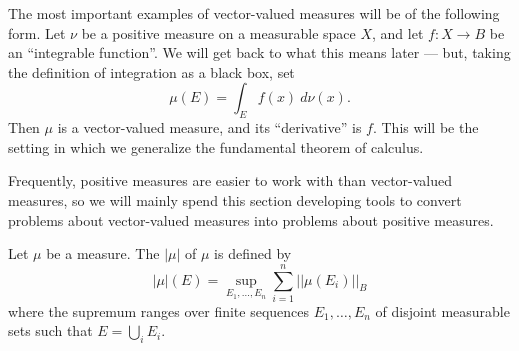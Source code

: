 \begin{example}
The most important examples of vector-valued measures will be of the following form.
Let $\nu$ be a positive measure on a measurable space $X$, and let $f: X \to B$ be an ``integrable function''.
We will get back to what this means later --- but, taking the definition of integration as a black box, set
\[\mu(E) = \int_{E} f(x) ~d\nu(x).\]
Then $\mu$ is a vector-valued measure, and its ``derivative'' is $f$.
This will be the setting in which we generalize the fundamental theorem of calculus.
\end{example}

\begin{subsec}
Frequently, positive measures are easier to work with than vector-valued measures, so we will mainly spend this section developing tools to convert problems about vector-valued measures into problems about positive measures.
\end{subsec}

\begin{definition}
Let $\mu$ be a measure. The  $|\mu|$ of $\mu$ is defined by
\[|\mu|(E) = \sup_{E_{1}, \dots, E_{n}} \sum_{i=1}^{n} ||\mu(E_{i})||_{B}\]
where the supremum ranges over finite sequences $E_{1}, \dots, E_{n}$ of disjoint measurable sets such that $E = \bigcup_{i} E_{i}$.
\end{definition}

